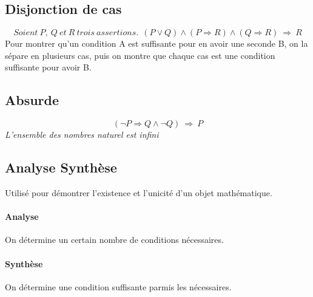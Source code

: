     \subsection{Disjonction de cas}
        $$Soient~P,~Q~et~R~trois~assertions.~~(P\vee Q)\wedge (P\Rightarrow R)\wedge (Q\Rightarrow R)~\Rightarrow ~R$$
        Pour montrer qu'un condition A est suffisante pour en avoir une seconde B, on la sépare en plusieurs cas, puis on montre que chaque cas est une condition suffisante pour avoir B.

    \subsection{Absurde}
        $$(\neg P\Rightarrow Q\wedge\neg Q)~\Rightarrow ~P$$
        \textsl{L'ensemble des nombres naturel est infini}

    \subsection{Analyse Synthèse}
        Utilisé pour démontrer l'existence et l'unicité d'un objet mathématique.
        \paragraph{Analyse}
        On détermine un certain nombre de conditions nécessaires.
        \paragraph{Synthèse}
        On détermine une condition suffisante parmis les nécessaires.

